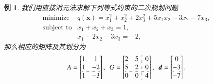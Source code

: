 \documentclass{SBCbookchapter}
\newcommand{\V}[1]{{\bm{#1}}}
\newtheorem{eg}[thm]{例}
\numberwithin{equation}{section}
\begin{document}
\begin{eg}
\label{eg:7.2.1}
我们用直接消元法求解下列等式约束的二次规划问题
\begin{equation*}
\begin{array}{cl}
\text{minimize} & q(\V{x}) = x_1^2 + x_2^2 + 2x_3^2 + 5x_1x_2 - 3x_2 - 7x_3, \\
\text{subject to} & x_1 + x_2 + x_3 = 1, \\
& x_1 - 2x_2 - 3x_3 = -2,
\end{array}
\end{equation*}
那么相应的矩阵及其划分为
\begin{equation*}
A = \left[\begin{array}{@{}cc@{}} 1 & 1 \\ 1 & -2 \\ \hdashline 1 & -3 \end{array}\right], ~~ G = \left[\begin{array}{@{}cc:c@{}} 2 & 5 & 0 \\ 5 & 2 & 0 \\ \hdashline 0 & 0 & 4 \end{array}\right], ~~ \V{d} = \left[\begin{array}{@{}c@{}} 0 \\ -3 \\ \hdashline -7 \end{array}\right].
\end{equation*}


\end{eg}
\end{document}
